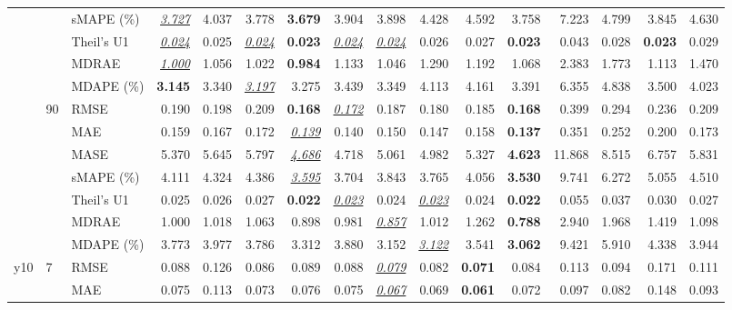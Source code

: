 \begin{table}[!htbp]
{\begin{tabular}{lllrrrrrrrrrrrrr}
 &  & sMAPE (\%) & \underline{\textit{3.727}} & 4.037 & 3.778 & \textbf{3.679} & 3.904 & 3.898 & 4.428 & 4.592 & 3.758 & 7.223 & 4.799 & 3.845 & 4.630 \\
 &  & Theil's U1 & \underline{\textit{0.024}} & 0.025 & \underline{\textit{0.024}} & \textbf{0.023} & \underline{\textit{0.024}} & \underline{\textit{0.024}} & 0.026 & 0.027 & \textbf{0.023} & 0.043 & 0.028 & \textbf{0.023} & 0.029 \\
 &  & MDRAE & \underline{\textit{1.000}} & 1.056 & 1.022 & \textbf{0.984} & 1.133 & 1.046 & 1.290 & 1.192 & 1.068 & 2.383 & 1.773 & 1.113 & 1.470 \\
 &  & MDAPE (\%) & \textbf{3.145} & 3.340 & \underline{\textit{3.197}} & 3.275 & 3.439 & 3.349 & 4.113 & 4.161 & 3.391 & 6.355 & 4.838 & 3.500 & 4.023 \\
\cmidrule(lr){2-16}
 & 90 & RMSE & 0.190 & 0.198 & 0.209 & \textbf{0.168} & \underline{\textit{0.172}} & 0.187 & 0.180 & 0.185 & \textbf{0.168} & 0.399 & 0.294 & 0.236 & 0.209 \\
 &  & MAE & 0.159 & 0.167 & 0.172 & \underline{\textit{0.139}} & 0.140 & 0.150 & 0.147 & 0.158 & \textbf{0.137} & 0.351 & 0.252 & 0.200 & 0.173 \\
 &  & MASE & 5.370 & 5.645 & 5.797 & \underline{\textit{4.686}} & 4.718 & 5.061 & 4.982 & 5.327 & \textbf{4.623} & 11.868 & 8.515 & 6.757 & 5.831 \\
 &  & sMAPE (\%) & 4.111 & 4.324 & 4.386 & \underline{\textit{3.595}} & 3.704 & 3.843 & 3.765 & 4.056 & \textbf{3.530} & 9.741 & 6.272 & 5.055 & 4.510 \\
 &  & Theil's U1 & 0.025 & 0.026 & 0.027 & \textbf{0.022} & \underline{\textit{0.023}} & 0.024 & \underline{\textit{0.023}} & 0.024 & \textbf{0.022} & 0.055 & 0.037 & 0.030 & 0.027 \\
 &  & MDRAE & 1.000 & 1.018 & 1.063 & 0.898 & 0.981 & \underline{\textit{0.857}} & 1.012 & 1.262 & \textbf{0.788} & 2.940 & 1.968 & 1.419 & 1.098 \\
 &  & MDAPE (\%) & 3.773 & 3.977 & 3.786 & 3.312 & 3.880 & 3.152 & \underline{\textit{3.122}} & 3.541 & \textbf{3.062} & 9.421 & 5.910 & 4.338 & 3.944 \\
\midrule
y10 & 7 & RMSE & 0.088 & 0.126 & 0.086 & 0.089 & 0.088 & \underline{\textit{0.079}} & 0.082 & \textbf{0.071} & 0.084 & 0.113 & 0.094 & 0.171 & 0.111 \\
 &  & MAE & 0.075 & 0.113 & 0.073 & 0.076 & 0.075 & \underline{\textit{0.067}} & 0.069 & \textbf{0.061} & 0.072 & 0.097 & 0.082 & 0.148 & 0.093 \\

\end{tabular}}
\end{table}
